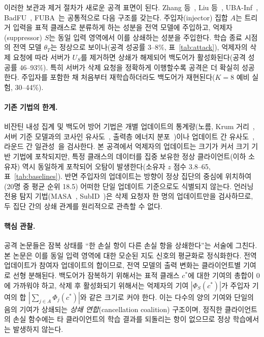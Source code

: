 \documentclass[10pt,a4paper]{article}
\begin{document}
이러한 보관과 제거 절차가 새로운 공격 표면이 된다. Zhang 등~\cite{zhang2023}, Liu 등~\cite{liu2024}, UBA-Inf~\cite{ubainf}, BadFU~\cite{badfu}, FUBA~\cite{fuba}는 공통적으로 다음 구조를 갖는다. 주입자(injector) 집합 $A$는 트리거 입력을 표적 클래스로 분류하게 하는 성분을 전역 모델에 주입하고, 억제자(suppressor) $S$는 동일 입력 영역에서 이를 상쇄하는 성분을 주입한다. 학습 종료 시점의 전역 모델 $\theta_T$는 정상으로 보이나(공격 성공률 3--8\%, 표~\ref{tab:attack}), 억제자의 삭제 요청에 따라 서버가 $U_S$를 제거하면 상쇄가 해제되어 백도어가 활성화된다(공격 성공률 46--93\%). 특히 서버가 삭제 요청을 정확하게 이행할수록 공격은 더 확실히 성공한다. 주입자를 포함한 채 처음부터 재학습하더라도 백도어가 재현된다($K=8$ 예비 실험, 30--44\%).

\paragraph{기존 기법의 한계.}
비잔틴 내성 집계 및 백도어 방어 기법은 개별 업데이트의 통계량(노름, Krum 거리~\cite{krum}, 서버 기준 모델과의 코사인 유사도~\cite{fltrust}, 출력층 에너지 분포~\cite{deepsight})이나 업데이트 간 유사도~\cite{foolsgold}, 라운드 간 일관성~\cite{fldetector}을 검사한다. 본 공격에서 억제자의 업데이트는 크기가 커서 크기 기반 기법에 포착되지만, 특정 클래스의 데이터를 집중 보유한 정상 클라이언트(이하 소유자) 역시 동일하게 포착되어 오탐이 발생한다(소유자 $z$ 점수 3.8--65, 표~\ref{tab:baselines}). 반면 주입자의 업데이트는 방향이 정상 집단의 중심에 위치하여(20명 중 평균 순위 18.5) 어떠한 단일 업데이트 기준으로도 식별되지 않는다. 언러닝 전용 탐지 기법(MASA~\cite{masa}, SubID~\cite{subid})은 삭제 요청자 한 명의 업데이트만을 검사하므로, 두 집단 간의 상쇄 관계를 원리적으로 관측할 수 없다.

\paragraph{핵심 관찰.}
공격 논문들은 잠복 상태를 ``한 손실 항이 다른 손실 항을 상쇄한다''는 서술에 그친다. 본 논문은 이를 동일 입력 영역에 대한 모순된 지도 신호의 평균화로 정식화한다. 전역 업데이트가 참여자 업데이트의 합이므로, 전역 모델의 출력 변화는 클라이언트별 기여로 선형 분해된다. 백도어가 잠복하기 위해서는 표적 클래스 $c^*$에 대한 기여의 총합이 0에 가까워야 하고, 삭제 후 활성화되기 위해서는 억제자의 기여 $|\Phi_S(c^*)|$가 주입자 기여의 합 $|\sum_{j\in A}\Phi_j(c^*)|$와 같은 크기로 커야 한다. 이는 다수의 양의 기여와 단일의 음의 기여가 상쇄되는 \emph{상쇄 연합}(cancellation coalition) 구조이며, 정직한 클라이언트의 손실 함수에는 타 클라이언트의 학습 결과를 되돌리는 항이 없으므로 정상 학습에서는 발생하지 않는다.
\end{document}
